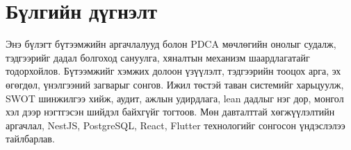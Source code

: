 \section*{Бүлгийн дүгнэлт}
Энэ бүлэгт бүтээмжийн аргачлалууд болон PDCA мөчлөгийн онолыг судалж, тэдгээрийг дадал болгоход сануулга, хяналтын механизм шаардлагатайг тодорхойлов. Бүтээмжийг хэмжих долоон үзүүлэлт, тэдгээрийн тооцох арга, эх өгөгдөл, үнэлгээний загварыг сонгов. Ижил төстэй таван системийг харьцуулж, SWOT шинжилгээ хийж, аудит, ажлын удирдлага, lean дадлыг нэг дор, монгол хэл дээр нэгтгэсэн шийдэл байхгүйг тогтоов. Мөн давталттай хөгжүүлэлтийн аргачлал, NestJS, PostgreSQL, React, Flutter технологийг сонгосон үндэслэлээ тайлбарлав.

